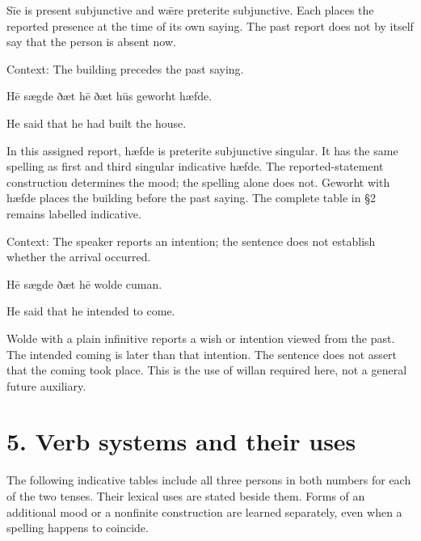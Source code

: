 Sīe is present subjunctive and wǣre preterite subjunctive. Each places the reported presence at the time of its own saying. The past report does not by itself say that the person is absent now.

Context: The building precedes the past saying.

Hē sægde ðæt hē ðæt hūs geworht hæfde.

He said that he had built the house.

In this assigned report, hæfde is preterite subjunctive singular. It has the same spelling as first and third singular indicative hæfde. The reported-statement construction determines the mood; the spelling alone does not. Geworht with hæfde places the building before the past saying. The complete table in §2 remains labelled indicative.

Context: The speaker reports an intention; the sentence does not establish whether the arrival occurred.

Hē sægde ðæt hē wolde cuman.

He said that he intended to come.

Wolde with a plain infinitive reports a wish or intention viewed from the past. The intended coming is later than that intention. The sentence does not assert that the coming took place. This is the use of willan required here, not a general future auxiliary.

\section*{5. Verb systems and their uses}

The following indicative tables include all three persons in both numbers for each of the two tenses. Their lexical uses are stated beside them. Forms of an additional mood or a nonfinite construction are learned separately, even when a spelling happens to coincide.

